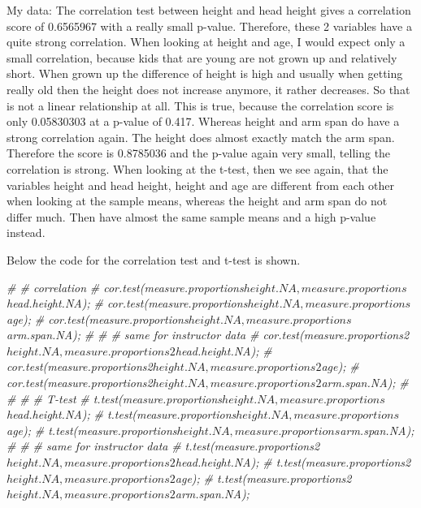 \documentclass[]{article}
\newenvironment{Shaded}{\begin{snugshade}}{\end{snugshade}}
\newcommand{\CommentTok}[1]{\textcolor[rgb]{0.56,0.35,0.01}{\textit{#1}}}
\begin{document}
My data: The correlation test between height and head height gives a
correlation score of 0.6565967 with a really small p-value. Therefore,
these 2 variables have a quite strong correlation. When looking at
height and age, I would expect only a small correlation, because kids
that are young are not grown up and relatively short. When grown up the
difference of height is high and usually when getting really old then
the height does not increase anymore, it rather decreases. So that is
not a linear relationship at all. This is true, because the correlation
score is only 0.05830303 at a p-value of 0.417. Whereas height and arm
span do have a strong correlation again. The height does almost exactly
match the arm span. Therefore the score is 0.8785036 and the p-value
again very small, telling the correlation is strong. When looking at the
t-test, then we see again, that the variables height and head height,
height and age are different from each other when looking at the sample
means, whereas the height and arm span do not differ much. Then have
almost the same sample means and a high p-value instead.

Below the code for the correlation test and t-test is shown.

\begin{Shaded}
\begin{Highlighting}[]
\CommentTok{\# \# correlation}
\CommentTok{\# cor.test(measure.proportions$height.NA, measure.proportions$head.height.NA);}
\CommentTok{\# cor.test(measure.proportions$height.NA, measure.proportions$age);}
\CommentTok{\# cor.test(measure.proportions$height.NA, measure.proportions$arm.span.NA);}
\CommentTok{\# }
\CommentTok{\# \# same for instructor data}
\CommentTok{\# cor.test(measure.proportions2$height.NA, measure.proportions2$head.height.NA);}
\CommentTok{\# cor.test(measure.proportions2$height.NA, measure.proportions2$age);}
\CommentTok{\# cor.test(measure.proportions2$height.NA, measure.proportions2$arm.span.NA);}
\CommentTok{\# }
\CommentTok{\# }
\CommentTok{\# \# T{-}test}
\CommentTok{\# t.test(measure.proportions$height.NA, measure.proportions$head.height.NA);}
\CommentTok{\# t.test(measure.proportions$height.NA, measure.proportions$age);}
\CommentTok{\# t.test(measure.proportions$height.NA, measure.proportions$arm.span.NA);}
\CommentTok{\# }
\CommentTok{\# \# same for instructor data}
\CommentTok{\# t.test(measure.proportions2$height.NA, measure.proportions2$head.height.NA);}
\CommentTok{\# t.test(measure.proportions2$height.NA, measure.proportions2$age);}
\CommentTok{\# t.test(measure.proportions2$height.NA, measure.proportions2$arm.span.NA);}
\end{Highlighting}
\end{Shaded}
\end{document}
